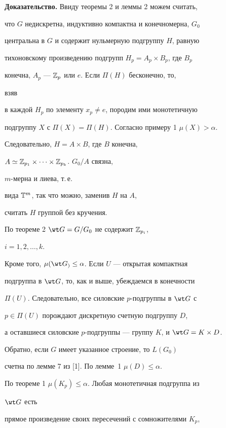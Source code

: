  


{\bf Доказательство.} Ввиду теоремы 2 и леммы 2 можем считать,  


что $G$ недискретна, индуктивно компактна и конечномерна, $G_0$ 


центральна в $G$ и содержит нульмерную подгруппу $H$, равную  


тихоновскому произведению подгрупп $H_p=A_p\times B_p$, где $B_p$ 


конечна, $A_p$ --- $\Bbb Z_p$ или $e$. Если $\Pi(H)$ бесконечно, то, 


взяв 


в каждой $H_p$ по элементу $x_p\ne e$, породим ими монотетичную  


подгруппу $X$ с $\Pi(X)=\Pi(H)$. Согласно примеру 1\; $\mu(X)>\alpha$. 


Следовательно, $H=A\times B$, где $B$ конечна, 


$A\simeq\Bbb Z_{p_1}\times\dotsb\times\Bbb Z_{p_k}$.\; $G_0/A$ связна, 


$m$-мерна и лиева, т.\,е. 


вида $\Bbb T^m$, так что можно, заменив $H$ на $A$, 


считать $H$ группой без кручения. 


 


По теореме 2\; $\wt G=G/G_0$ не содержит $\Bbb Z_{p_i}$, 


$i=1,2,\dotsc,k$. 


Кроме того, $\mu(\wt G_)\le\alpha$. Если $U$ --- открытая компактная 


подгруппа в $\wt G$, то, как и выше, убеждаемся в конечности  


$\Pi(U)$. Следовательно, все силовские $p$-подгруппы в $\wt G$ с 


$p\in\Pi(U)$ порождают дискретную счетную подгруппу $D$, 


а оставшиеся силовские $p$-подгруппы --- группу $K$, и $\wt G=K\times 


D$. 


 


Обратно, если $G$ имеет указанное строение, то $L(G_0)$ 


счетна по лемме 7 из [1]. По лемме~1\; $\mu(D)\le\alpha$. 


По теореме 1\; $\mu(K_p)\le\alpha$. Любая монотетичная подгруппа из 


$\wt G$ есть  


прямое произведение своих пересечений с сомножителями $K_p$, 


